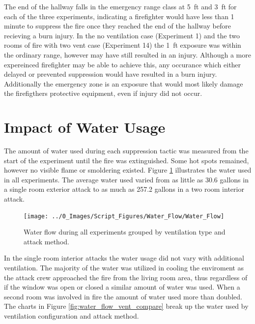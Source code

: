 \documentclass[12pt,oneside]{book}
\begin{document}
The end of the hallway falls in the emergency range class at 5~ft and 3~ft for each of the three experiments, indicating a firefighter would have less than 1 minute to suppress the fire once they reached the end of the hallway before recieving a burn injury. In the no ventilation case (Experiment 1) and the two rooms of fire with two vent case (Experiment 14) the 1~ft exposure was within the ordinary range, however may have still resulted in an injury. Although a more expereinced firefighter may be able to achieve this, any occurance which either delayed or prevented suppression would have resulted in a burn injury. Additionally the emergency zone is an exposure that would most likely damage the firefigthers protective equipment, even if injury did not occur. 

\section{Impact of Water Usage}
The amount of water used during each suppression tactic was measured from the start of the experiment until the fire was extinguished. Some hot spots remained, however no visible flame or smoldering existed. Figure \ref{fig:water_flow_all} illustrates the water used in all experiments. The average water used varied from as little as 30.6 gallons in a single room exterior attack to as much as 257.2 gallons in a two room interior attack.

\begin{figure}[H]
\centering
\texttt{[image: ../0\_Images/Script\_Figures/Water\_Flow/Water\_Flow]}
\caption[Water Floor All Experiments]{Water flow during all experiments grouped by ventilation type and attack method.}
\label{fig:water_flow_all}
\end{figure}

In the single room interior attacks the water usage did not vary with additional ventilation. The majority of the water was utilized in cooling the enviroment as the attack crew approached the fire from the living room area, thus regardless of if the window was open or closed a similar amount of water was used. When a second room was involved in fire the amount of water used more than doubled. The charts in Figure \ref{fig:water_flow_vent_compare} break up the water used by ventilation configuration and attack method.  
\end{document}
